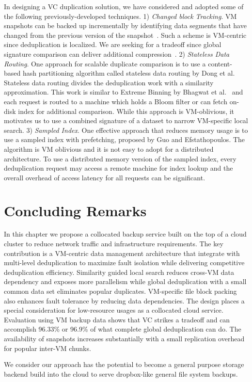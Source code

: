 In designing a VC duplication solution, we have considered and adopted some of
the following previously-developed techniques.
1)
{\em Changed block Tracking}.
VM snapshots can be  backed up  incrementally by identifying data segments that have
changed from the previous version of the snapshot~\cite{Clements2009,Vrable2009,TanIPDPS2011}.
Such a scheme  is  VM-centric since deduplication is localized. 
We are seeking for a tradeoff since 
global signature comparison can deliver additional compression~\cite{Guo2011,Dong2011,extreme_binning09}.
2) {\em Stateless Data Routing}.
One approach for scalable duplicate comparison is to use a content-based hash
partitioning algorithm called stateless data routing by Dong et al.~\cite{Dong2011} 
Stateless data routing divides the deduplication work with a similarity approximation. This work 
is similar to Extreme Binning by Bhagwat et al.~\cite{extreme_binning09} and 
each request is routed  to a machine which holds
a Bloom filter  or can fetch on-disk index for additional comparison.
While this approach is VM-oblivious, it motivates us to  use  a combined signature of a dataset to narrow
VM-specific local search.
3) {\em Sampled Index}.
One effective approach that reduces memory usage is 
to use a sampled index with prefetching, proposed  by Guo and Efstathopoulos\cite{Guo2011}. 
The algorithm is VM oblivious and it is not easy  to adopt for a distributed architecture. 
To use a distributed memory version of the sampled index, every deduplication request
may access a remote machine for index lookup and the overall overhead of access latency for all requests
can be significant.  

\section{Concluding Remarks}
\label{data:concl}
In this chapter we propose a collocated backup service built on
the top of a cloud cluster to reduce network traffic and infrastructure requirements.
The key contribution is a VM-centric data management architecture that
integrate with multi-level deduplication to 
maximize fault isolation while delivering competitive deduplication efficiency.
Similarity guided local search reduces cross-VM data dependency and exposes more parallelism  
while global deduplication with a small common data set eliminates popular duplicates.
VM-specific file block packing also enhances fault tolerance by reducing data dependencies.
The design places a special consideration for low-resource usages as a collocated cloud service.
Evaluation using  VM backup data shows that VC strikes a tradeoff and 
can accomplish 96.33\% or 96.9\% of what complete global
deduplication can do.  The availability of snapshots increases substantially with 
a small replication overhead for popular inter-VM chunks.

We consider our approach has the potential to become a general purpose storage backend build
into the cloud to serve dropbox-like general file system backups. 